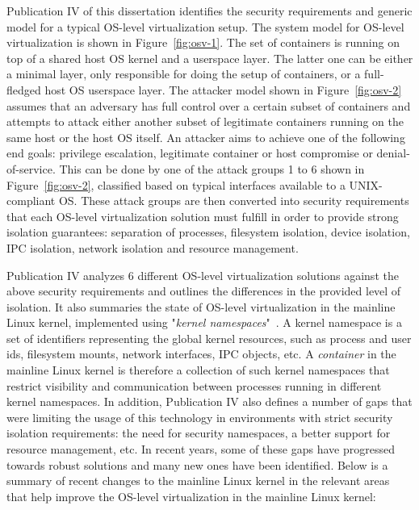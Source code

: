 Publication IV of this dissertation identifies the security requirements and generic model for a typical OS-level virtualization setup.
The system model for OS-level virtualization is shown in Figure~\ref{fig:osv-1}. The set of containers  is running on top of a shared host OS kernel and a userspace layer. The latter one can be either a minimal layer, only responsible for doing the setup of containers, or a full-fledged host OS userspace layer. The attacker model shown in Figure~\ref{fig:osv-2} assumes that an adversary has full control over a certain subset of containers and attempts to attack either another subset of legitimate containers running on the same host or the host OS itself. An attacker aims to achieve one of the following end goals: privilege escalation, legitimate container or host compromise or denial-of-service. This can be done by one of the attack groups 1 to 6 shown in Figure~\ref{fig:osv-2}, classified based on typical interfaces available to a UNIX-compliant OS. These attack groups are then converted into security requirements that each OS-level virtualization solution must fulfill in order to provide strong isolation guarantees: separation of processes, filesystem isolation, device isolation, IPC isolation, network isolation and resource management.   

Publication IV analyzes 6 different OS-level virtualization solutions against the above security requirements and outlines the differences in the provided level of isolation. It also summaries the state of OS-level virtualization in the mainline Linux kernel, implemented using "\textit{kernel namespaces}"~\cite{biederman2006}. A kernel namespace is a set of identifiers representing the global kernel resources, such as process and user ids, filesystem mounts, network interfaces, IPC objects, etc. A \textit{container} in the mainline Linux kernel is therefore a collection of such kernel namespaces that restrict visibility and communication between processes running in different kernel namespaces. In addition, Publication IV also defines a number of gaps that were limiting the usage of this technology in environments with strict security isolation requirements: the need for security namespaces, a better support for resource management, etc. In recent years, some of these gaps have progressed towards robust solutions and many new ones have been identified. Below is a summary of recent changes to the mainline Linux kernel in the relevant areas that help improve the OS-level virtualization in the mainline Linux kernel:  

